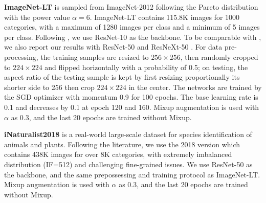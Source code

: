  \textbf{ImageNet-LT} \cite{liu2019large} is sampled from ImageNet-2012 \cite{deng2009imagenet} following the Pareto distribution with the power value $\alpha=6$. ImageNet-LT contains 115.8K images for 1000 categories, with a maximum of 1280 images per class and a minimum of 5 images per class. Following \cite{liu2019large, kang2019decoupling, xiang2020learning, zhang2021bag}, we use ResNet-10 as the backbone. To be comparable with \cite{kang2019decoupling,wang2020long}, we also report our results with ResNet-50 and ResNeXt-50 \cite{xie2017aggregated}. For data pre-processing, the training samples are resized to $256 \times 256$, then randomly cropped to $224 \times 224$ and flipped horizontally with a probability of 0.5; on testing, the aspect ratio of the testing sample is kept by first resizing proportionally its shorter side to 256 then crop $224 \times 224$ in the center. The networks are trained by the SGD optimizer with momentum 0.9 for 100 epochs. The base learning rate is 0.1 and decreases by 0.1 at epoch 120 and 160. Mixup augmentation is used with $\alpha$ as 0.3, and the last 20 epochs are trained without Mixup.
 
\textbf{iNaturalist2018} \cite{van2018inaturalist} is a real-world large-scale dataset for species identification of animals and plants. Following the literature, we use the 2018 version which contains 438K images for over 8K categories, with extremely imbalanced distribution (IF=512) and challenging fine-grained issues. We use ResNet-50 as the backbone, and the same prepossessing and training protocol as ImageNet-LT. Mixup augmentation is used with $\alpha$ as 0.3, and the last 20 epochs are trained without Mixup.

